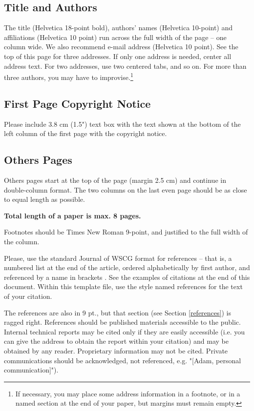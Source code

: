\documentclass[twoside,twocolumn,10pt]{article}
\begin{document}
\subsection*{Title and Authors}
The title (Helvetica 18-point bold), authors' names (Helvetica 10-point) and affiliations (Helvetica 10 point) run across the full width of the page -- one column wide. We also recommend e-mail address (Helvetica 10 point). See the top of this page for three addresses. If only one address is needed, center all address text. For two addresses, use two centered tabs, and so on. For more than three authors, you may have to improvise.\footnote{If necessary, you may place some address information in a footnote, or in a named section at the end of your paper, but margins must remain empty.} 

\subsection*{First Page Copyright Notice}
Please include 3.8 cm (1.5") text box with the text shown at the bottom of the left column of the first page with the copyright notice.

\subsection*{Others Pages}
Others pages start at the top of the page (margin 2.5 cm) and continue in double-column format.  The two columns on the last even page should be as close to equal length as possible. 

{\bfseries Total length of a paper is max. 8 pages.}

Footnotes should be Times New Roman 9-point, and justified to the full width of the column.

Please, use the standard Journal of WSCG format for references -- that is, a numbered list at the end of the article, ordered alphabetically by first author, and referenced by a name in brackets \cite{con00a}. See the examples of citations at the end of this document. Within this template file, use the style named references for the text of your citation.

The references are also in 9 pt., but that section (see Section \ref{references}) is ragged right. References should be published materials accessible to the public. Internal technical reports may be cited only if they are easily accessible (i.e. you can give the address to obtain the report within your citation) and may be obtained by any reader. Proprietary information may not be cited. Private communications should be acknowledged, not referenced, e.g. "[Adam, personal communication]").
\end{document}
